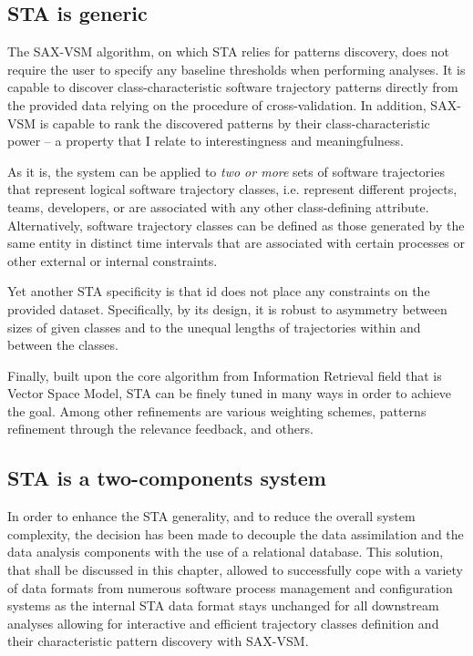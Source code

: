 \subsection{STA is generic}
The \mbox{SAX-VSM} algorithm, on which STA relies for patterns discovery, does not require the user to specify any baseline thresholds when performing analyses. It is capable to discover class-characteristic software trajectory patterns directly from the provided data  relying on the procedure of cross-validation.  In addition, SAX-VSM is capable to rank the discovered patterns by their class-characteristic power -- a property that I relate to interestingness and meaningfulness.

As it is, the system can be applied to \textit{two or more} sets of software trajectories that represent logical software trajectory classes, i.e. represent different projects, teams, developers, or are associated with any other class-defining attribute. Alternatively, software trajectory classes can be defined as those generated by the same entity in distinct time intervals that are associated with certain processes or other external or internal constraints.

Yet another STA specificity is that id does not place any constraints on the provided dataset. Specifically, by its design, it is robust to asymmetry between sizes of given classes and to the unequal lengths of trajectories within and between the classes.

Finally, built upon the core algorithm from Information Retrieval field that is Vector Space Model, STA can be finely tuned in many ways in order to achieve the goal. Among other refinements are various weighting schemes, patterns refinement through the relevance feedback, and others.

\subsection{STA is a two-components system}\label{two_components}
In order to enhance the STA generality, and to reduce the overall system complexity, the decision has been made to decouple the data assimilation and the data analysis components with the use of a relational database. This solution, that shall be discussed in this chapter, allowed to successfully cope with a variety of data formats from numerous software process management and configuration systems as the internal STA data format stays unchanged for all downstream analyses allowing for interactive and efficient trajectory classes definition and their characteristic pattern discovery with \mbox{SAX-VSM}. 

